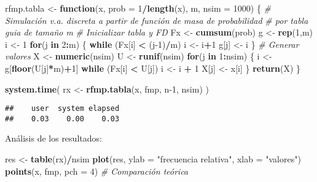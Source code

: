 \documentclass[
]{book}
\newenvironment{Shaded}{\begin{snugshade}}{\end{snugshade}}
\newcommand{\CommentTok}[1]{\textcolor[rgb]{0.56,0.35,0.01}{\textit{#1}}}
\newcommand{\ControlFlowTok}[1]{\textcolor[rgb]{0.13,0.29,0.53}{\textbf{#1}}}
\newcommand{\DataTypeTok}[1]{\textcolor[rgb]{0.13,0.29,0.53}{#1}}
\newcommand{\DecValTok}[1]{\textcolor[rgb]{0.00,0.00,0.81}{#1}}
\newcommand{\KeywordTok}[1]{\textcolor[rgb]{0.13,0.29,0.53}{\textbf{#1}}}
\newcommand{\NormalTok}[1]{#1}
\newcommand{\OperatorTok}[1]{\textcolor[rgb]{0.81,0.36,0.00}{\textbf{#1}}}
\newcommand{\StringTok}[1]{\textcolor[rgb]{0.31,0.60,0.02}{#1}}
\theoremstyle{break}
\theoremstyle{definition}
\theoremstyle{definition}
\theoremstyle{definition}
\theoremstyle{remark}
\begin{document}
\begin{Shaded}
\begin{Highlighting}[]
\NormalTok{rfmp.tabla <-}\StringTok{ }\ControlFlowTok{function}\NormalTok{(x, }\DataTypeTok{prob =} \DecValTok{1}\OperatorTok{/}\KeywordTok{length}\NormalTok{(x), m, }\DataTypeTok{nsim =} \DecValTok{1000}\NormalTok{) \{}
  \CommentTok{# Simulación v.a. discreta a partir de función de masa de probabilidad}
  \CommentTok{# por tabla guia de tamaño m}
  \CommentTok{# Inicializar tabla y FD}
\NormalTok{  Fx <-}\StringTok{ }\KeywordTok{cumsum}\NormalTok{(prob)}
\NormalTok{  g <-}\StringTok{ }\KeywordTok{rep}\NormalTok{(}\DecValTok{1}\NormalTok{,m)}
\NormalTok{  i <-}\StringTok{ }\DecValTok{1}
  \ControlFlowTok{for}\NormalTok{(j }\ControlFlowTok{in} \DecValTok{2}\OperatorTok{:}\NormalTok{m) \{}
    \ControlFlowTok{while}\NormalTok{ (Fx[i] }\OperatorTok{<}\StringTok{ }\NormalTok{(j}\DecValTok{-1}\NormalTok{)}\OperatorTok{/}\NormalTok{m) i <-}\StringTok{ }\NormalTok{i}\OperatorTok{+}\DecValTok{1}
\NormalTok{    g[j] <-}\StringTok{ }\NormalTok{i}
\NormalTok{  \}}
  \CommentTok{# Generar valores}
\NormalTok{  X <-}\StringTok{ }\KeywordTok{numeric}\NormalTok{(nsim)}
\NormalTok{  U <-}\StringTok{ }\KeywordTok{runif}\NormalTok{(nsim)}
  \ControlFlowTok{for}\NormalTok{(j }\ControlFlowTok{in} \DecValTok{1}\OperatorTok{:}\NormalTok{nsim) \{}
\NormalTok{    i <-}\StringTok{ }\NormalTok{g[}\KeywordTok{floor}\NormalTok{(U[j]}\OperatorTok{*}\NormalTok{m)}\OperatorTok{+}\DecValTok{1}\NormalTok{]}
    \ControlFlowTok{while}\NormalTok{ (Fx[i] }\OperatorTok{<}\StringTok{ }\NormalTok{U[j]) i <-}\StringTok{ }\NormalTok{i }\OperatorTok{+}\StringTok{ }\DecValTok{1}
\NormalTok{    X[j] <-}\StringTok{ }\NormalTok{x[i]}
\NormalTok{  \}}
  \KeywordTok{return}\NormalTok{(X)}
\NormalTok{\}}

\KeywordTok{system.time}\NormalTok{( rx <-}\StringTok{ }\KeywordTok{rfmp.tabla}\NormalTok{(x, fmp, n}\DecValTok{-1}\NormalTok{, nsim) )}
\end{Highlighting}
\end{Shaded}

\begin{verbatim}
##    user  system elapsed 
##    0.03    0.00    0.03
\end{verbatim}

Análisis de los resultados:

\begin{Shaded}
\begin{Highlighting}[]
\NormalTok{res <-}\StringTok{ }\KeywordTok{table}\NormalTok{(rx)}\OperatorTok{/}\NormalTok{nsim}
\KeywordTok{plot}\NormalTok{(res, }\DataTypeTok{ylab =} \StringTok{"frecuencia relativa"}\NormalTok{, }\DataTypeTok{xlab =} \StringTok{"valores"}\NormalTok{)}
\KeywordTok{points}\NormalTok{(x, fmp, }\DataTypeTok{pch =} \DecValTok{4}\NormalTok{)  }\CommentTok{# Comparación teórica}
\end{Highlighting}
\end{Shaded}
\end{document}
